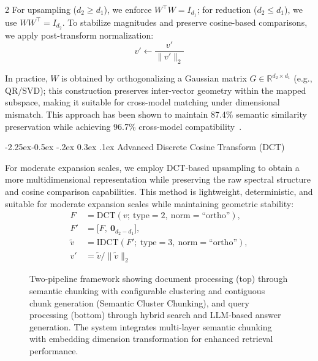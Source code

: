 \documentclass[10pt,letterpaper]{article}
\makeatletter
\let\cite\citep
\renewcommand{\subsubsection}{\@startsection{subsubsection}{3}{\z@}%
                                     {-2.25ex\@plus -0.5ex \@minus -.2ex}%
                                     {0.3ex \@plus .1ex}%
                                     {\normalfont\normalsize\itshape}}
\makeatother
\begin{document}
\begin{multicols}{2}
For upsampling ($d_2 \ge d_1$), we enforce $W^\top W = I_{d_1}$; for reduction ($d_2 \le d_1$), we use $W W^\top = I_{d_2}$. To stabilize magnitudes and preserve cosine-based comparisons, we apply post-transform normalization:
\begin{equation}
v' \leftarrow \frac{v'}{\lVert v' \rVert_2}
\end{equation}

In practice, $W$ is obtained by orthogonalizing a Gaussian matrix $G \in \mathbb{R}^{d_2 \times d_1}$ (e.g., QR/SVD); this construction preserves inter-vector geometry within the mapped subspace, making it suitable for cross-model matching under dimensional mismatch. This approach has been shown to maintain 87.4\% semantic similarity preservation while achieving 96.7\% cross-model compatibility~\cite{conneau2018word}.

\subsubsection{Advanced Discrete Cosine Transform (DCT)}

For moderate expansion scales, we employ DCT-based upsampling to obtain a more multidimensional representation while preserving the raw spectral structure and cosine comparison capabilities. This method is lightweight, deterministic, and suitable for moderate expansion scales while maintaining geometric stability:
\begin{align*} 
F &= \mathrm{DCT}(v;\ \text{type}=2,\ \text{norm}=\text{``ortho''}), \\
F' &= \big[F,\ \mathbf{0}_{d_2-d_1}\big], \\
\tilde v &= \mathrm{IDCT}(F';\ \text{type}=3,\ \text{norm}=\text{``ortho''}), \\
v' &= \tilde v \big/ \lVert \tilde v\rVert_2
\end{align*}

\begin{figure}[!htbp]
    \centering
    
    \caption{Two-pipeline framework showing document processing (top) through semantic chunking with configurable clustering and contiguous chunk generation (Semantic Cluster Chunking), and query processing (bottom) through hybrid search and LLM-based answer generation. The system integrates multi-layer semantic chunking with embedding dimension transformation for enhanced retrieval performance.}
    \label{fig:rag_architecture}
\end{figure}


\end{multicols}
\end{document}
